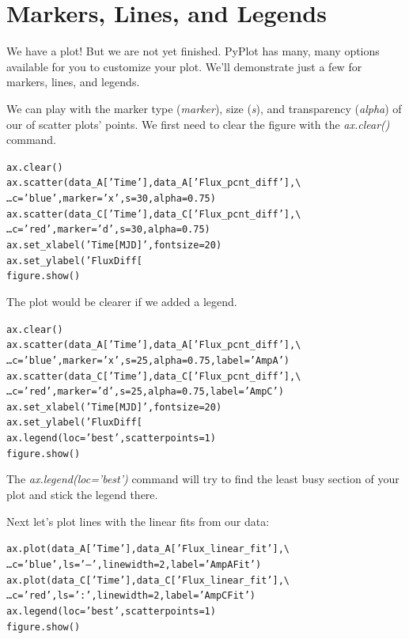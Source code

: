 \section{Markers, Lines, and Legends}  %

We have a plot! But we are not yet finished.
PyPlot has many, many options available for you to customize
your plot. We'll demonstrate just a few for markers, lines, and legends. 

We can play with the marker type (\textit{marker}), size (\textit{s}), and 
transparency (\textit{alpha}) of our of scatter plots' points. We first
need to clear the figure with the \textit{ax.clear()} command.

\begin{alltt}
\pytab ax.clear()
\pytab ax.scatter(data_A['Time'], data_A['Flux_pcnt_diff'], \textbackslash 
\ldots   c='blue', marker='x', s=30, alpha=0.75)
\pytab ax.scatter(data_C['Time'], data_C['Flux_pcnt_diff'], \textbackslash 
\ldots   c='red', marker='d', s=30, alpha=0.75)
\pytab ax.set_xlabel('Time [MJD]', fontsize=20)
\pytab ax.set_ylabel('Flux Diff [%
\pytab figure.show()
\end{alltt}

The plot would be clearer if we added a legend.

\begin{alltt}
\pytab ax.clear()
\pytab ax.scatter(data_A['Time'], data_A['Flux_pcnt_diff'], \textbackslash 
\ldots   c='blue', marker='x', s=25, alpha=0.75, label='Amp A')
\pytab ax.scatter(data_C['Time'], data_C['Flux_pcnt_diff'], \textbackslash 
\ldots   c='red', marker='d', s=25, alpha=0.75, label='Amp C')
\pytab ax.set_xlabel('Time [MJD]', fontsize=20)
\pytab ax.set_ylabel('Flux Diff [%
\pytab ax.legend(loc='best', scatterpoints=1)
\pytab figure.show()
\end{alltt}

The \textit{ax.legend(loc='best')} command will try to find the least busy section 
of your plot and stick the legend there. 

Next let's plot lines with the linear fits from our data:

\begin{alltt}
\pytab ax.plot(data_A['Time'], data_A['Flux_linear_fit'], \textbackslash 
\ldots  c='blue', ls='--', linewidth=2, label='Amp A Fit')
\pytab ax.plot(data_C['Time'], data_C['Flux_linear_fit'], \textbackslash 
\ldots  c='red', ls=':', linewidth=2, label='Amp C Fit')
\pytab ax.legend(loc='best', scatterpoints=1)
\pytab figure.show()
\end{alltt}

